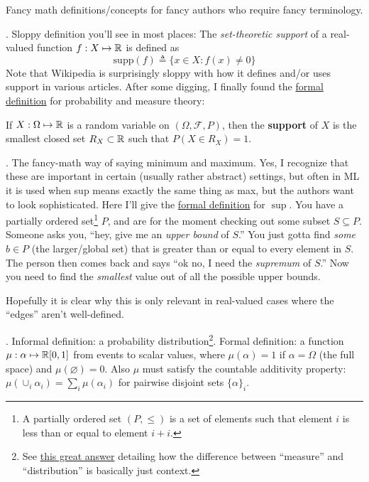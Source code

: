 \documentclass[11pt]{article}
\begin{document}


Fancy math definitions/concepts for fancy authors who require fancy terminology.
\begin{compactitem}
	\item {}. Sloppy definition you'll see in most places: The \textit{set-theoretic support} of a real-valued function $f : X \mapsto \mathbb{R}$ is defined as 
	$$
		\text{supp}(f) \triangleq \{x \in X: f(x) \ne 0\}
	$$
	Note that Wikipedia is surprisingly sloppy with how it defines and/or uses support in various articles. After some digging, I finally found the \href{https://www.wikiwand.com/en/Support_(mathematics)#/In_probability_and_measure_theory}{formal definition} for probability and measure theory:
	\begin{definition}
		If $X : \Omega \mapsto \mathbb{R}$ is a random variable on $(\Omega, \mathcal F, P)$, then the \textbf{support} of $X$ is the smallest closed set $R_X \subset \mathbb{R}$ such that $P(X \in R_X) = 1$. 
	\end{definition}
	
	\item {}. The fancy-math way of saying minimum and maximum. Yes, I recognize that these are important in certain (usually rather abstract) settings, but often in ML it is used when sup means exactly the same thing as max, but the authors want to look sophisticated. Here I'll give the \href{https://www.wikiwand.com/en/Infimum_and_supremum#/Formal_definition}{formal definition} for $\sup$. You have a partially ordered set\footnote{A partially ordered set $(P, \le)$ is a set of elements such that element $i$ is less than or equal to element $i + i$.} $P$, and are for the moment checking out some subset $S \subseteq P$. Someone asks you, ``hey, give me an \textit{upper bound} of $S$.'' You just gotta find \textit{some} $b \in P$ (the larger/global set) that is greater than or equal to every element in $S$. The person then comes back and says ``ok no, I need the \textit{supremum} of $S$.'' Now you need to find the \textit{smallest} value out of all the possible upper bounds. 
	
	Hopefully it is clear why this is only relevant in real-valued cases where the ``edges'' aren't well-defined. 
	
	\item {}. Informal definition: a probability distribution\footnote{See \href{https://math.stackexchange.com/a/1073804}{this great answer} detailing how the difference between ``measure'' and ``distribution'' is basically just context.}. Formal definition: a function $\mu: \alpha \mapsto \mathbb{R}[0, 1]$ from events to scalar values, where $\mu(\alpha) = 1$ if $\alpha = \Omega$ (the full space) and $\mu(\varnothing) = 0$. Also $\mu$ must satisfy the countable additivity property: $\mu(\cup_{i} \alpha_i) = \sum_{i} \mu(\alpha_i)$ for pairwise disjoint sets $\{\alpha\}_i$. 
\end{compactitem}
\end{document}
